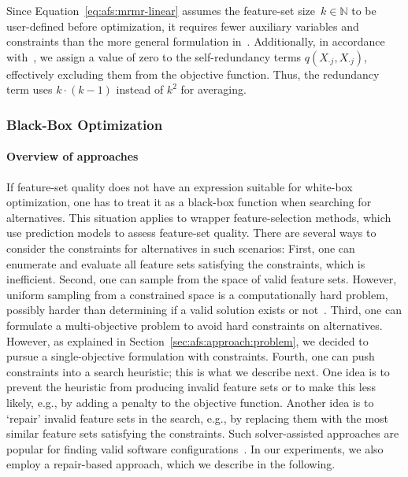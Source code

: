 \documentclass[iicol, sn-basic, Numbered]{sn-jnl} %
\theoremstyle{plain}
\theoremstyle{definition}
\begin{document}
Since Equation~\ref{eq:afs:mrmr-linear} assumes the feature-set size~$k \in \mathbb{N}$ to be user-defined before optimization, it requires fewer auxiliary variables and constraints than the more general formulation in~\cite{nguyen2009optimizing, nguyen2010towards}.
Additionally, in accordance with~\cite{nguyen2014effective}, we assign a value of zero to the self-redundancy terms $q(X_{\cdot{}j},X_{\cdot{}j})$, effectively excluding them from the objective function.
Thus, the redundancy term uses $k \cdot (k-1)$ instead of $k^2$ for averaging.

\subsubsection{Black-Box Optimization}
\label{sec:afs:approach:objectives:black-box}

\paragraph{Overview of approaches}

If feature-set quality does not have an expression suitable for white-box optimization, one has to treat it as a black-box function when searching for alternatives.
This situation applies to wrapper feature-selection methods, which use prediction models to assess feature-set quality.
There are several ways to consider the constraints for alternatives in such scenarios:
First, one can enumerate and evaluate all feature sets satisfying the constraints, which is inefficient.
Second, one can sample from the space of valid feature sets.
However, uniform sampling from a constrained space is a computationally hard problem, possibly harder than determining if a valid solution exists or not~\cite{ermon2012uniform}.
Third, one can formulate a multi-objective problem to avoid hard constraints on alternatives.
However, as explained in Section~\ref{sec:afs:approach:problem}, we decided to pursue a single-objective formulation with constraints.
Fourth, one can push constraints into a search heuristic; this is what we describe next.
One idea is to prevent the heuristic from producing invalid feature sets or to make this less likely, e.g., by adding a penalty to the objective function.
Another idea is to `repair' invalid feature sets in the search, e.g., by replacing them with the most similar feature sets satisfying the constraints.
Such solver-assisted approaches are popular for finding valid software configurations~\cite{guo2018preserve, henard2015combining, white2010automated}.
In our experiments, we also employ a repair-based approach, which we describe in the following.
\end{document}
